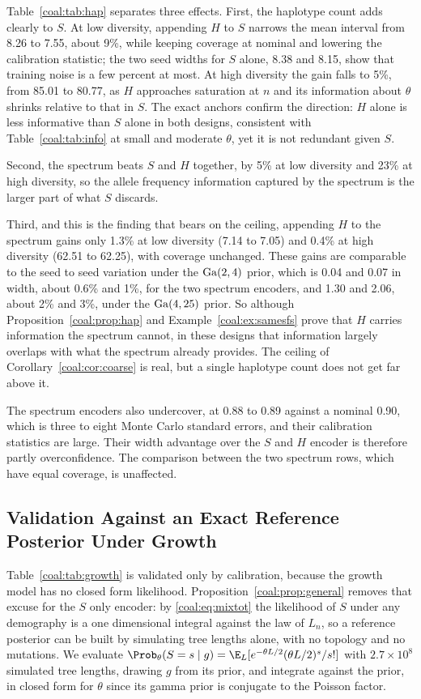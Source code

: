 Table~\ref{coal:tab:hap} separates three effects. First, the haplotype count adds clearly to $S$. At low diversity, appending $H$ to $S$ narrows the mean interval from 8.26 to 7.55, about 9\%, while keeping coverage at nominal and lowering the calibration statistic; the two seed widths for $S$ alone, 8.38 and 8.15, show that training noise is a few percent at most. At high diversity the gain falls to 5\%, from 85.01 to 80.77, as $H$ approaches saturation at $n$ and its information about $\theta$ shrinks relative to that in $S$. The exact anchors confirm the direction: $H$ alone is less informative than $S$ alone in both designs, consistent with Table~\ref{coal:tab:info} at small and moderate $\theta$, yet it is not redundant given $S$.

Second, the spectrum beats $S$ and $H$ together, by 5\% at low diversity and 23\% at high diversity, so the allele frequency information captured by the spectrum is the larger part of what $S$ discards.

Third, and this is the finding that bears on the ceiling, appending $H$ to the spectrum gains only 1.3\% at low diversity (7.14 to 7.05) and 0.4\% at high diversity (62.51 to 62.25), with coverage unchanged. These gains are comparable to the seed to seed variation under the $\mathrm{Ga}(2,4)$ prior, which is 0.04 and 0.07 in width, about 0.6\% and 1\%, for the two spectrum encoders, and 1.30 and 2.06, about 2\% and 3\%, under the $\mathrm{Ga}(4,25)$ prior. So although Proposition~\ref{coal:prop:hap} and Example~\ref{coal:ex:samesfs} prove that $H$ carries information the spectrum cannot, in these designs that information largely overlaps with what the spectrum already provides. The ceiling of Corollary~\ref{coal:cor:coarse} is real, but a single haplotype count does not get far above it.

The spectrum encoders also undercover, at 0.88 to 0.89 against a nominal 0.90, which is three to eight Monte Carlo standard errors, and their calibration statistics are large. Their width advantage over the $S$ and $H$ encoder is therefore partly overconfidence. The comparison between the two spectrum rows, which have equal coverage, is unaffected.

\subsection{Validation Against an Exact Reference Posterior Under Growth}\label{coal:sec:reference}

Table~\ref{coal:tab:growth} is validated only by calibration, because the growth model has no closed form likelihood. Proposition~\ref{coal:prop:general} removes that excuse for the $S$ only encoder: by \eqref{coal:eq:mixtot} the likelihood of $S$ under any demography is a one dimensional integral against the law of $L_n$, so a reference posterior can be built by simulating tree lengths alone, with no topology and no mutations. We evaluate $\Prob_\theta(S=s\mid g)=\E_L[e^{-\theta L/2}(\theta L/2)^s/s!]$ with $2.7\times10^8$ simulated tree lengths, drawing $g$ from its prior, and integrate against the prior, in closed form for $\theta$ since its gamma prior is conjugate to the Poisson factor.

